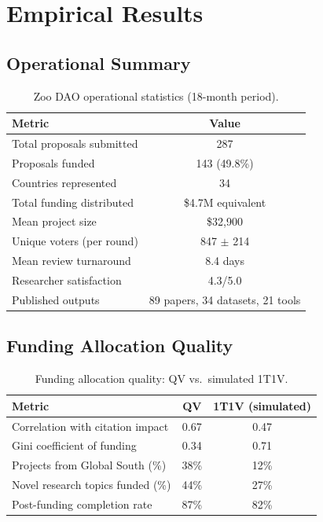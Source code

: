 \section{Empirical Results}

\label{sec:results}

\subsection{Operational Summary}

\begin{table}[H]
\centering
\caption{Zoo DAO operational statistics (18-month period).}
\label{tab:ops}
\begin{tabular}{lc}
\toprule
\textbf{Metric} & \textbf{Value} \\
\midrule
Total proposals submitted & 287 \\
Proposals funded & 143 (49.8\%) \\
Countries represented & 34 \\
Total funding distributed & \$4.7M equivalent \\
Mean project size & \$32{,}900 \\
Unique voters (per round) & 847 $\pm$ 214 \\
Mean review turnaround & 8.4 days \\
Researcher satisfaction & 4.3/5.0 \\
Published outputs & 89 papers, 34 datasets, 21 tools \\
\bottomrule
\end{tabular}
\end{table}

\subsection{Funding Allocation Quality}

\begin{table}[H]
\centering
\caption{Funding allocation quality: QV vs.\ simulated 1T1V.}
\label{tab:allocation}
\begin{tabular}{lcc}
\toprule
\textbf{Metric} & \textbf{QV} & \textbf{1T1V (simulated)} \\
\midrule
Correlation with citation impact & 0.67 & 0.47 \\
Gini coefficient of funding & 0.34 & 0.71 \\
Projects from Global South (\%) & 38\% & 12\% \\
Novel research topics funded (\%) & 44\% & 27\% \\
Post-funding completion rate & 87\% & 82\% \\
\bottomrule
\end{tabular}
\end{table}

